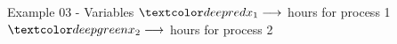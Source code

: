 \begin{frame}{Example 03 - Variables}
\Huge{
$\colora{{x}_{1}} \longrightarrow$
    hours for process 1 \\ \vspace{1cm}
$\colorb{{x}_{2}} \longrightarrow$
    hours for process 2
}
\end{frame}
